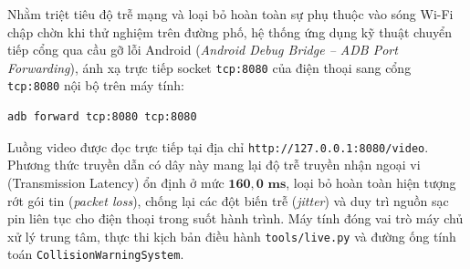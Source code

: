 \documentclass[12pt,a4paper]{article}
\begin{document}
Nhằm triệt tiêu độ trễ mạng và loại bỏ hoàn toàn sự phụ thuộc vào sóng Wi-Fi chập chờn khi thử nghiệm trên đường phố, hệ thống ứng dụng kỹ thuật chuyển tiếp cổng qua cầu gỡ lỗi Android (\textit{Android Debug Bridge -- ADB Port Forwarding}), ánh xạ trực tiếp socket \texttt{tcp:8080} của điện thoại sang cổng \texttt{tcp:8080} nội bộ trên máy tính:
\begin{lstlisting}[language=bash, basicstyle=\small\ttfamily]
adb forward tcp:8080 tcp:8080
\end{lstlisting}
Luồng video được đọc trực tiếp tại địa chỉ \texttt{http://127.0.0.1:8080/video}. Phương thức truyền dẫn có dây này mang lại độ trễ truyền nhận ngoại vi (Transmission Latency) ổn định ở mức $\mathbf{160,0\text{ ms}}$, loại bỏ hoàn toàn hiện tượng rớt gói tin (\textit{packet loss}), chống lại các đột biến trễ (\textit{jitter}) và duy trì nguồn sạc pin liên tục cho điện thoại trong suốt hành trình. Máy tính đóng vai trò máy chủ xử lý trung tâm, thực thi kịch bản điều hành \texttt{tools/live.py} và đường ống tính toán \texttt{CollisionWarningSystem}.
\end{document}
